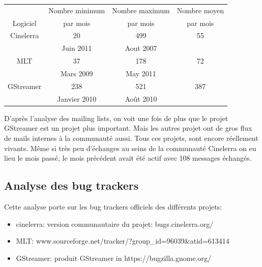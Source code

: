 \begin{center}

  \begin{tabular}{ | c | c | c | c|}

    \hline

         & Nombre minimum & Nombre maximum & Nombre moyen \\

Logiciel & par mois       & par mois   & par mois \\

\hline \hline

Cinelerra & 20 & 499 & 55 \\

          &  Juin 2011 & Aout 2007 & \\

\hline

MLT\index{MLT} & 37 & 178 & 72 \\

     & Mars 2009 & May 2011 & \\

\hline

GStreamer & 238 & 521 &  387\\

          & Janvier 2010 & Août 2010 & \\

\hline

  \end{tabular}

\end{center}

D'après l'analyse des mailing lists, on voit une fois de plus que le
projet GStreamer est un projet plus important. Mais les autres projet
ont de gros flux de mails internes à la communauté aussi. Tous ces
projets, sont encore réellement vivants. Même si très peu d'échanges
au seins de la communauté Cinelerra on eu lieu le mois passé, le mois
précédent avait été actif avec 108 messages échangés.

\subsection {Analyse des bug trackers}

Cette analyse porte sur les bug trackers officiels des différents
projets:

\begin{itemize}

  \item {cinelerra: version communautaire du projet:
    bugs.cinelerra.org/}

  \item {MLT:
  www.sourceforge.net/tracker/?group\_id=96039\&atid=613414}

  \item {GStreamer: produit GStreamer in https://bugzilla.gnome.org/}

\end{itemize}


